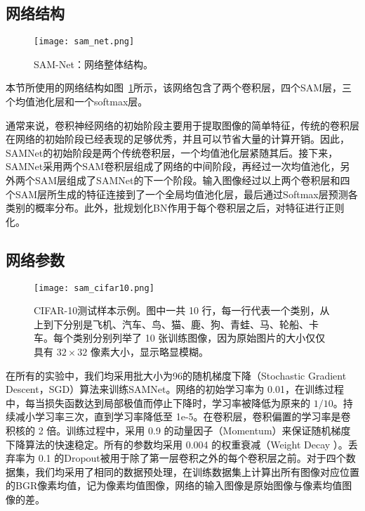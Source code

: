 \subsection{网络结构}
\label{sec:sap:experiment:arc}

\begin{figure}[t]
\centering
\texttt{[image: sam\_net.png]}
\caption{SAM-Net：网络整体结构。}
\label{fig:net}
\end{figure}

本节所使用的网络结构如图~\ref{fig:net}所示，该网络包含了两个卷积层，四个SAM层，三个均值池化层和一个softmax层。

通常来说，卷积神经网络的初始阶段主要用于提取图像的简单特征，传统的卷积层在网络的初始阶段已经表现的足够优秀，并且可以节省大量的计算开销。因此，SAMNet的初始阶段是两个传统卷积层，一个均值池化层紧随其后。接下来，SAMNet采用两个SAM卷积层组成了网络的中间阶段，再经过一次均值池化，另外两个SAM层组成了SAMNet的下一个阶段。输入图像经过以上两个卷积层和四个SAM层所生成的特征连接到了一个全局均值池化层，最后通过Softmax层预测各类别的概率分布。此外，批规划化BN作用于每个卷积层之后，对特征进行正则化。

\subsection{网络参数}
\label{sec:sap:experiment:param}

\begin{figure}[!h]
\centering
\texttt{[image: sam\_cifar10.png]}
\caption{CIFAR-10测试样本示例。图中一共 10 行，每一行代表一个类别，从上到下分别是飞机、汽车、鸟、猫、鹿、狗、青蛙、马、轮船、卡车。每个类别分别列举了 10 张训练图像，因为原始图片的大小仅仅具有 $32\times32$ 像素大小，显示略显模糊。}
\label{fig:sam_cifar10}
\end{figure}


在所有的实验中，我们均采用批大小为96的随机梯度下降（Stochastic Gradient Descent，SGD）算法来训练SAMNet。网络的初始学习率为 0.01，在训练过程中，每当损失函数达到局部极值而停止下降时，学习率被降低为原来的 $1/10$。持续减小学习率三次，直到学习率降低至 1e-5。在卷积层，卷积偏置的学习率是卷积核的 2 倍。训练过程中，采用 0.9 的动量因子（Momentum）来保证随机梯度下降算法的快速稳定。所有的参数均采用 0.004 的权重衰减（Weight Decay ）。丢弃率为 0.1 的Dropout被用于除了第一层卷积之外的每个卷积层之前。对于四个数据集，我们均采用了相同的数据预处理，在训练数据集上计算出所有图像对应位置的BGR像素均值，记为像素均值图像，网络的输入图像是原始图像与像素均值图像的差。

